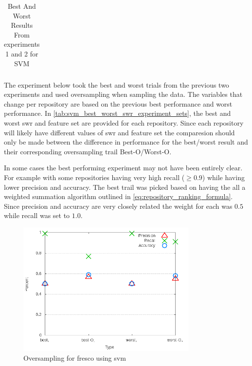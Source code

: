 \begin{table}[ht]
\begin{center}
\begin{tabular}{|c|c|c|c|c|}

        \hline
    \end{tabular}
    \caption{Best And Worst Results From experiments 1 and 2 for SVM}
    \label{tab:svm_best_worst_swr_experiment_sets}
\end{center}
\end{table}

The experiment below took the best and worst trials from the previous two experiments and used oversampling when sampling the data. The variables that change per repository are based on the previous best performance and worst performance. In \autoref{tab:svm_best_worst_swr_experiment_sets}, the best and worst \gls{swr} and feature set are provided for each repository. Since each repository will likely have different values of \gls{swr} and feature set the comparesion should only be made between the difference in performance for the best/worst result and their corresponding oversampling trail Best-O/Worst-O.

In some cases the best performing experiment may not have been entirely clear. For example with some repositories having very high recall ($ \geq 0.9$) while having lower precision and accuracy. The best trail was picked based on having the all a weighted summation algorithm outlined in \autoref{eq:repository_ranking_formula}. Since precision and accuracy are very closely related the weight for each was $0.5$ while recall was set to $1.0$.


\begin{figure}[!t]
    \centering
        \includegraphics[width=0.8\textwidth]{images/svm/test_4/fresco_sample_range}
        \caption{Oversampling for fresco using \gls{svm}}
        \label{fig:test_4_fresco_svm}
\end{figure}

